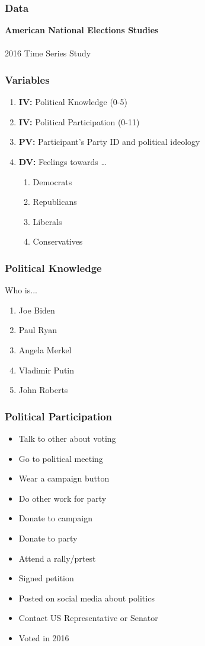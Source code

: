 \documentclass[14pt]{beamer}
\newcommand\tb{\textbf}
\begin{document}
\begin{frame}
\frametitle{Data}
\begin{center}
	\tb{American National Elections Studies}
	~~\\
	~~\\
	2016 Time Series Study
\end{center}
\end{frame}

\begin{frame}
\frametitle{Variables}
\begin{enumerate}
	\item \tb{IV:} Political Knowledge (0-5)
	\item \tb{IV:} Political Participation (0-11)
	\item \tb{PV:} Participant's Party ID and political ideology
	\item \tb{DV:} Feelings towards \ldots
	\begin{enumerate}
		\item Democrats
		\item Republicans
		\item Liberals
		\item Conservatives
	\end{enumerate}
\end{enumerate}
\end{frame}


\begin{frame}
\frametitle{Political Knowledge}
Who is...
\begin{enumerate}
	\item Joe Biden
	\item Paul Ryan
	\item Angela Merkel
	\item Vladimir Putin
	\item John Roberts
\end{enumerate}
\end{frame}

\begin{frame}
\small
\frametitle{Political Participation}
\begin{multicols}{2}
\begin{itemize}
	\item Talk to other about voting
	\item Go to political meeting
	\item Wear a campaign button
	\item Do other work for party
	\item Donate to campaign
	\item Donate to party
	\item Attend a rally/prtest
	\item Signed petition
	\item Posted on social media about politics
	\item Contact US Representative or Senator
	\item Voted in 2016
\end{itemize}
\end{multicols}	
\end{frame}
\end{document}
